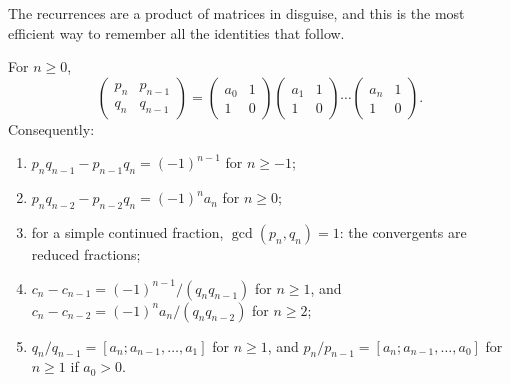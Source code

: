 The recurrences are a product of matrices in disguise, and this is the most efficient way to remember all the identities that follow.

\begin{proposition}\label{continued-fractions:proposition-matrices}
For $n \geq 0$,
\[
\begin{pmatrix} p_n & p_{n-1}\\ q_n & q_{n-1} \end{pmatrix} = \begin{pmatrix} a_0 & 1\\ 1 & 0 \end{pmatrix}\begin{pmatrix} a_1 & 1\\ 1 & 0 \end{pmatrix} \cdots \begin{pmatrix} a_n & 1\\ 1 & 0 \end{pmatrix}.
\]
Consequently:
\begin{enumerate}
\item $p_nq_{n-1} - p_{n-1}q_n = (-1)^{n-1}$ for $n \geq -1$;
\item $p_nq_{n-2} - p_{n-2}q_n = (-1)^na_n$ for $n \geq 0$;
\item for a simple continued fraction, $\gcd(p_n, q_n) = 1$: the convergents are reduced fractions;
\item $c_n - c_{n-1} = (-1)^{n-1}/(q_nq_{n-1})$ for $n \geq 1$, and $c_n - c_{n-2} = (-1)^na_n/(q_nq_{n-2})$ for $n \geq 2$;
\item $q_n/q_{n-1} = [a_n; a_{n-1}, \ldots, a_1]$ for $n \geq 1$, and $p_n/p_{n-1} = [a_n; a_{n-1}, \ldots, a_0]$ for $n \geq 1$ if $a_0 > 0$.
\end{enumerate}
\end{proposition}

